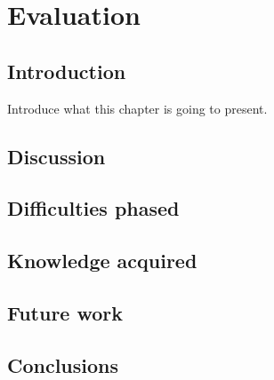 \chapter{Evaluation}

\section{Introduction}
Introduce what this chapter is going to present.
\section{Discussion}

\section{Difficulties phased}

\section{Knowledge acquired}

\section{Future work}

\section{Conclusions}